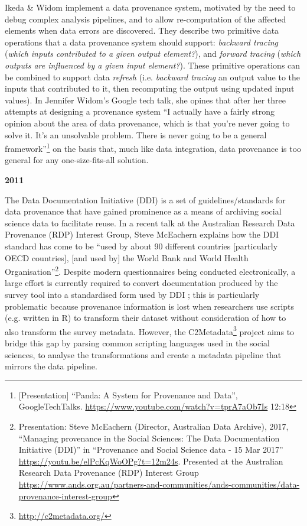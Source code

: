 Ikeda \& Widom \cite{Ikeda2010} implement a data provenance system, motivated by the need to debug complex analysis pipelines, and to allow re-computation of the affected elements when data errors are discovered. They describe two primitive data operations that a data provenance system should support: \textit{backward tracing} (\textit{which inputs contributed to a given output element?}), and \textit{forward tracing} (\textit{which outputs are influenced by a given input element?}). These primitive operations can be combined to support data \textit{refresh} (i.e. \textit{backward tracing} an output value to the inputs that contributed to it, then recomputing the output using updated input values). In Jennifer Widom's Google tech talk, she opines that after her three attempts at designing a provenance system ``I actually have a fairly strong opinion about the area of data provenance, which is that you're never going to solve it. It's an unsolvable problem. There is never going to be a general framework''\footnote{[Presentation] ``Panda: A System for Provenance and Data'', GoogleTechTalks. \url{https://www.youtube.com/watch?v=tprA7aOb7Is} 12:18} on the basis that, much like data integration, data provenance is too general for any one-size-fits-all solution.

\textbf{2011}

The Data Documentation Initiative (DDI) \cite{Gregory2011} is a set of guidelines/standards for data provenance that have gained prominence as a means of archiving social science data to facilitate reuse. In a recent talk at the Australian Research Data Provenance (RDP) Interest Group, Steve McEachern explains how the DDI standard has come to be ``used by about 90 different countries [particularly OECD countries], [and used by] the World Bank and World Health Organisation''\footnote{Presentation: Steve McEachern (Director, Australian Data Archive), 2017, ``Managing provenance in the Social Sciences: The Data Documentation Initiative (DDI)'' in ``Provenance and Social Science data - 15 Mar 2017'' \url{https://youtu.be/elPcKqWoOPg?t=12m24s}. Presented at the Australian Research Data Provenance (RDP) Interest Group \url{https://www.ands.org.au/partners-and-communities/ands-communities/data-provenance-interest-group}}. Despite modern questionnaires being conducted electronically, a large effort is currently required to convert documentation produced by the survey tool into a standardised form used by DDI \cite{Vardigan2014}; this is particularly problematic because provenance information is lost when researchers use scripts (e.g. written in R) to transform their dataset without consideration of how to also transform the survey metadata. However, the C2Metadata\footnote{\url{http://c2metadata.org/}} project aims to bridge this gap by parsing common scripting languages used in the social sciences, to analyse the transformations and create a metadata pipeline that mirrors the data pipeline.

